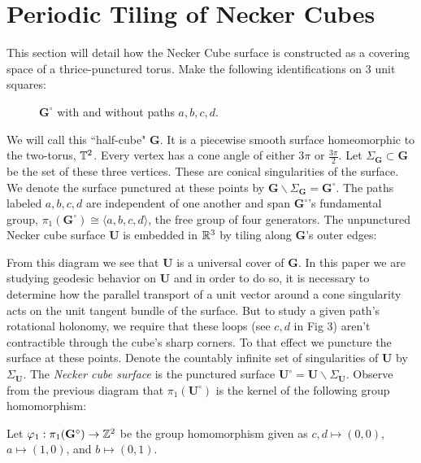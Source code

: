 \documentclass[]{article}
\def\bU{\mathbf{U}} \def\btU{\tilde{\bU}} \def\bUs{\bU^\circ}
\def\bG{\mathbf{G}} \def\bGs{\mathbf{G}^\circ}
\def\<{\langle} \def\>{\rangle}
\begin{document}
\newpage

\section{Periodic Tiling of Necker Cubes}
This section will detail how the Necker Cube surface is constructed as a covering space of a thrice-punctured torus. Make the following identifications on 3 unit squares:
\begin{figure}[H]
\centering

\caption{$\bGs$ with and without paths $a,b,c,d$.}
\end{figure}

We will call this ``half-cube" $\bG$. It is a piecewise smooth surface homeomorphic to the two-torus, $\mathbb{T}^2$. Every vertex has a cone angle of either $3\pi$ or $\frac{3\pi}{2}$. Let $\Sigma_{\bG}\subset\bG$ be the set of these three vertices. These are conical singularities of the surface. We denote the surface punctured at these points by $\bG\backslash\Sigma_{\bG} = \bGs$. The paths labeled $a,b,c,d$ are independent of one another and span $\bGs$'s fundamental group, $\pi_1(\bGs)\cong \<a,b,c,d \>$, the free group of four generators. The unpunctured Necker cube surface $\bU$ is embedded in $\mathbb{R}^3$ by tiling along $\bG$'s outer edges:

\begin{figure}[H]
\centering

\end{figure}
From this diagram we see that $\bU$ is a universal cover of $\bG$. In this paper we are studying geodesic behavior on $\bU$ and in order to do so, it is necessary to determine how the parallel transport of a unit vector around a cone singularity acts on the unit tangent bundle of the surface. But to study a given path's rotational holonomy, we require that these loops (see $c,d$ in Fig 3) aren't contractible through the cube's sharp corners. To that effect we puncture the surface at these points.  Denote the countably infinite set of singularities of $\bU$ by $\Sigma_{\bU}$. The \emph{Necker cube surface} is the punctured surface $\bUs=\bU\backslash\Sigma_{\bU}$. Observe from the previous diagram that $\pi_1(\bUs)$ is the kernel of the following group homomorphism:

\begin{Def}
Let $\varphi_1:\pi_1(\bGs)\rightarrow \ZZ^2$ be the group homomorphism given as $c,d\mapsto(0,0)$, $a\mapsto(1,0)$, and $b\mapsto(0,1)$.
\end{Def}
\end{document}
